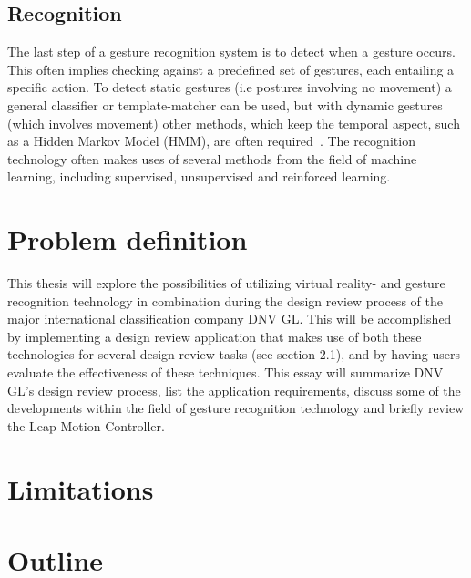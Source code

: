 \subsection{Recognition}
The last step of a gesture recognition system is to detect when a gesture occurs. 
This often implies checking against a predefined set of gestures, each entailing a specific action. 
To detect static gestures (i.e postures involving no movement) a general classifier or template-matcher can be used, 
but with dynamic gestures (which involves movement) other methods, which keep the temporal aspect, such as a Hidden Markov Model (HMM), are often required~\citep{Benton1995}. 
The recognition technology often makes uses of several methods from the field of machine learning, including supervised, unsupervised and reinforced learning.

\section{Problem definition}
This thesis will explore the possibilities of utilizing virtual reality- and gesture recognition technology in combination 
during the design review process of the major international classification company DNV GL. 
This will be accomplished by implementing a design review application that makes use of both these technologies for several design review tasks (see section 2.1), 
and by having users evaluate the effectiveness of these techniques. 
This essay will summarize DNV GL's design review process, list the application requirements, 
discuss some of the developments within the field of gesture recognition technology and briefly review the Leap Motion Controller.

\section{Limitations}

\section{Outline}